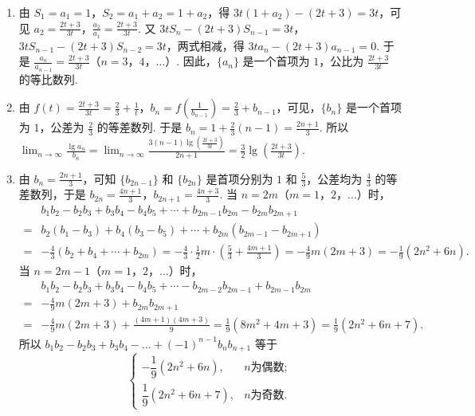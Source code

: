 \documentclass[UTF8,a4paper,oneside,11pt]{ctexbook}
\begin{document}
\begin{solution}
\begin{enumerate}
\item 由 \(S_1=a_1=1\)，\(S_2=a_1+a_2=1+a_2\)，得 \(3t(1+a_2)-(2t+3)=3t\)，可见 \(a_2=\frac{2t+3}{3t}\)，\(\frac{a_2}{a_1}=\frac{2t+3}{3t}\). 又 \(3tS_n-(2t+3)S_{n-1}=3t\)，\(3tS_{n-1}-(2t+3)S_{n-2}=3t\)，两式相减，得 \(3ta_n-(2t+3)a_{n-1}=0\). 于是 \(\frac{a_n}{a_{n-1}}=\frac{2t+3}{3t}\)（\(n=3\)，\(4\)，\(\dots\)）. 因此，\(\{a_n\}\) 是一个首项为 \(1\)，公比为 \(\frac{2t+3}{3t}\) 的等比数列.

\item 由 \(f(t)=\frac{2t+3}{3t}=\frac{2}{3}+\frac{1}{t}\)，\(b_n=f\left(\frac{1}{b_{n-1}}\right)=\frac{2}{3}+b_{n-1}\)，可见，\(\{b_n\}\) 是一个首项为 \(1\)，公差为 \(\frac{2}{3}\) 的等差数列. 于是 \(b_n=1+\frac{2}{3}(n-1)=\frac{2n+1}{3}\). 所以 \(\displaystyle\lim_{n\to\infty}\frac{\lg a_n}{b_n}=\displaystyle\lim_{n\to\infty}\frac{3(n-1)\lg \left(\frac{2t+3}{3t}\right)}{2n+1}=\frac{3}{2}\lg \left(\frac{2t+3}{3t}\right)\).

\item 由 \(b_n=\frac{2n+1}{3}\)，可知 \(\{b_{2n-1}\}\) 和 \(\{b_{2n}\}\) 是首项分别为 \(1\) 和 \(\frac{5}{3}\)，公差均为 \(\frac{4}{3}\) 的等差数列，于是 \(b_{2n}=\frac{4n+1}{3}\)，\(b_{2n+1}=\frac{4n+3}{3}\). 当 \(n=2m\)（\(m=1\)，\(2\)，\(\dots\)）时，
\[
\begin{aligned}
&b_1b_2-b_2b_3+b_3b_4-b_4b_5+\cdots+b_{2m-1}b_{2m}-b_{2m}b_{2m+1} \\
=&b_2(b_1-b_3)+b_4(b_3-b_5)+\cdots+b_{2m}(b_{2m-1}-b_{2m+1}) \\
=&-\frac{4}{3}(b_2+b_4+\cdots+b_{2m})
=-\frac{4}{3} \cdot \frac{1}{2}m \cdot \left(\frac{5}{3}+\frac{4m+1}{3}\right)
=-\frac{4}{9}m(2m+3)=-\frac{1}{9}(2n^2+6n).
\end{aligned}
\]
当 \(n=2m-1\)（\(m=1\)，\(2\)，\(\dots\)）时，
\[
\begin{aligned}
&b_1b_2-b_2b_3+b_3b_4-b_4b_5+\cdots-b_{2m-2}b_{2m-1}+b_{2m-1}b_{2m} \\
=&-\frac{4}{9}m(2m+3)+b_{2m}b_{2m+1} \\
=&-\frac{4}{9}m(2m+3)+\frac{(4m+1)(4m+3)}{9}
=\frac{1}{9}(8m^2+4m+3)=\frac{1}{9}(2n^2+6n+7).
\end{aligned}
\]
所以 \(b_1b_2-b_2b_3+b_3b_4-\dots+(-1)^{n-1}b_nb_{n+1}\) 等于
\[
\begin{cases}
-\dfrac{1}{9}(2n^2+6n), & n \text{为偶数};\\[2mm]
\dfrac{1}{9}(2n^2+6n+7), & n \text{为奇数}.
\end{cases}
\]
\end{enumerate}
\end{solution}

\end{document}
